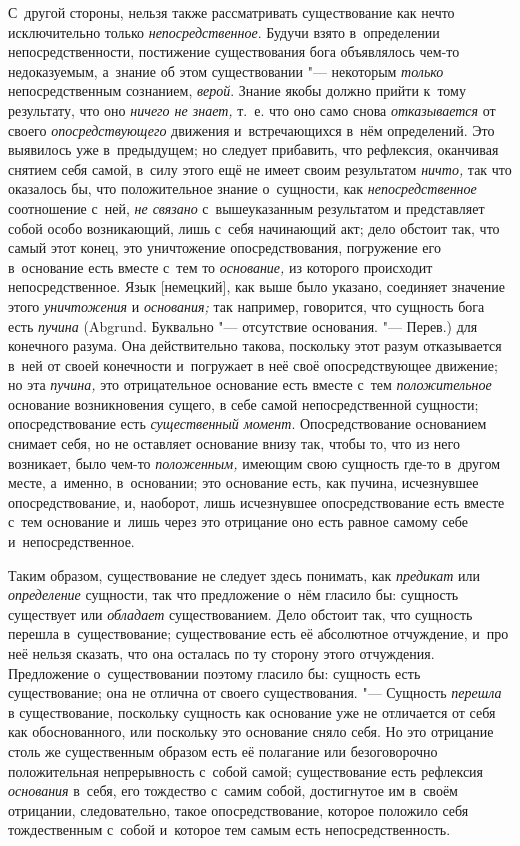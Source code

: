 С~другой стороны, нельзя также рассматривать существование как нечто
исключительно только {\em непосредственное}. Будучи
взято в~определении непосредственности, постижение существования бога
объявлялось чем-то недоказуемым, а~знание об этом существовании "--- некоторым
{\em только} непосредственным сознанием,
{\em верой}. Знание якобы должно прийти к~тому
результату, что оно {\em ничего не знает,} т.~е. что
оно само снова {\em отказывается} от своего
{\em опосредствующего} движения и~встречающихся в~нём
определений. Это выявилось уже в~предыдущем; но следует прибавить, что
рефлексия, оканчивая снятием себя самой, в~силу этого ещё не имеет своим
результатом {\em ничто,} так что оказалось бы, что
положительное знание о~сущности, как
{\em непосредственное} соотношение с~ней,
{\em не связано} с~вышеуказанным результатом и
представляет собой особо возникающий, лишь с~себя начинающий акт; дело
обстоит так, что самый этот конец, это уничтожение опосредствования,
погружение его в~основание есть вместе с~тем то
{\em основание,} из которого происходит
непосредственное. Язык [немецкий], как выше было указано, соединяет
значение этого {\em уничтожения} и
{\em основания;} так например, говорится, что сущность
бога есть {\em пучина} (Abgrund. Буквально "--- отсутствие
основания. "--- Перев.) для конечного разума. Она действительно такова,
поскольку этот разум отказывается в~ней от своей конечности и~погружает в
неё своё опосредствующее движение; но эта {\em пучина,}
это отрицательное основание есть вместе с~тем
{\em положительное} основание возникновения сущего, в
себе самой непосредственной сущности; опосредствование есть
{\em существенный момент}. Опосредствование основанием
снимает себя, но не оставляет основание внизу так, чтобы то, что из него
возникает, было чем-то {\em положенным,} имеющим свою
сущность где-то в~другом месте, а~именно, в~основании; это основание есть,
как пучина, исчезнувшее опосредствование, и, наоборот, лишь исчезнувшее
опосредствование есть вместе с~тем основание и~лишь через это отрицание оно
есть равное самому себе и~непосредственное.

Таким образом, существование не следует здесь понимать, как
{\em предикат} или
{\em определение} сущности, так что предложение о~нём
гласило бы: сущность существует или {\em обладает}
существованием. Дело обстоит так, что сущность перешла в~существование;
существование есть её абсолютное отчуждение, и~про неё нельзя сказать, что
она осталась по ту сторону этого отчуждения. Предложение о~существовании
поэтому гласило бы: сущность есть существование; она не отлична от своего
существования. "--- Сущность {\em перешла} в
существование, поскольку сущность как основание уже не отличается от себя
как обоснованного, или поскольку это основание сняло себя. Но это отрицание
столь же существенным образом есть её полагание или безоговорочно
положительная непрерывность с~собой самой; существование есть рефлексия
{\em основания} в~себя, его тождество с~самим собой,
достигнутое им в~своём отрицании, следовательно, такое опосредствование,
которое положило себя тождественным с~собой и~которое тем самым есть
непосредственность.

